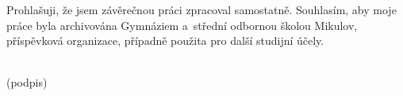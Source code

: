 Prohlašuji, že jsem závěrečnou práci zpracoval samostatně. Souhlasím, aby moje 
práce byla archivována Gymnáziem a~střední odbornou školou Mikulov, příspěvková 
organizace, případně použita pro další studijní účely.
\vspace{1cm}
\begin{center}
    \hdashrule{6cm}{1pt}{2pt}\\
    (podpis)
\end{center}
